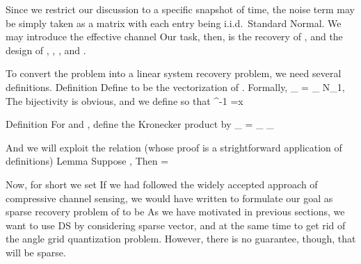 Since we restrict our discussion to a specific snapshot of time, the noise term may be simply taken as a matrix  with each entry being i.i.d.\ Standard Normal.
We may introduce the effective channel
%
%
Our task, then, is the recovery of , and the design of , , , and .

\stopsection
\startsubsection [title={Vectorization}]

To convert the problem into a linear system recovery problem, we need several definitions.
%
\Result
{Definition}
{
Define  to be the vectorization of .
Formally,
%
 {
\NC {} _{}
=\NC {} _{\; N_1, } \NR
}
%
The bijectivity is obvious, and we define  so that
%
 {
\NC {} ^{-1} 
=\NC x \NR
}
}

\Result
{Definition}
{
For  and , define the Kronecker product  by
%
 {
\NC \NC {} _{} \NR
\NC =\NC {} _{}
 _{} \NR
}
}

And we will exploit the relation (whose proof is a strightforward application of definitions)
\Result
{Lemma}
{
Suppose ,
Then
%
 {
\NC {} 
= \NC {}   \NR
}
}

Now, for short we set
%
%
If we had followed the widely accepted approach of compressive channel sensing, we would have written
%
%
to formulate our goal as sparse recovery problem of  to be
%
%
As we have motivated in previous sections, we want to use DS by considering sparse vector, and at the same time to get rid of the angle grid quantization problem.
However, there is no guarantee, though, that  will be sparse.

